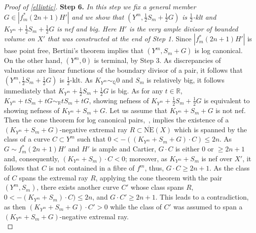 \documentclass{amsart}[12pt,a4paper]
\theoremstyle{definition}
\begin{document}
\begin{proof}[Proof of \ref{elliptic}]
{\bf Step 6.} {\it In this step we fix a general member $G \in |f_m^\ast(2n+1) H'|$ and we show that $(Y^m, \frac 1 2 S_m+\frac 1 2 G)$ is $\frac 1 2$-klt and $K_{Y^m}+\frac 1 2 S_m+\frac 1 2 G$ is nef and big.
Here $H'$ is the very ample divisor of bounded volume on $X'$ that was constructed at the end of Step 1.}
\newline
Since $|f_m^\ast (2n+1)H'|$ is base point free, Bertini's theorem implies that $(Y^m, S_m+G)$ is log canonical.
On the other hand, $(Y^m, 0)$ is terminal, by Step 3.
As discrepancies of valuations are linear functions of the boundary divisor of a pair, it follows that $(Y^m, \frac 1 2 S_m+\frac 1 2 G)$ is $\frac 1 2$-klt.
As $K_{Y^m} \sim_\mathbb{Q} 0$ and $S_m$ is relatively big, it follows immediately that $K_{Y^m}+\frac 1 2 S_m+\frac 1 2 G$ is big.
As for any $t \in \mathbb{R}$, $K_{Y^m}+t S_m+t G \sim_\mathbb{R} tS_m+tG$, showing nefness of $K_{Y^m}+\frac 1 2 S_m+\frac 1 2 G$ is equivalent to showing nefness of $K_{Y^m}+S_m+G$.
Let us assume that $K_{Y^m}+S_m+G$ is not nef.
Then the cone theorem for log canonical pairs,~\cite[Theorem 1.4]{MR2819675}, implies the existence of a $(K_{Y^m}+S_m+G)$-negative extremal ray $R \subset \overline{\mathrm{NE}}(X)$ which is spanned by the class of a curve $C \subset Y^m$ such that $0 <-((K_{Y^m}+S_m+G) \cdot C) \leq 2n$.
As $G \sim  f_m^\ast (2n+1) H'$ and $H'$ is ample and Cartier, $G \cdot C$ is either $0$ or $\geq 2n+1$ and, consequently, $(K_{Y^m} + S_m) \cdot C < 0$; moreover, as $K_{Y^m} + S_m$ is nef over $X'$, it follows that $C$ is not contained in a fibre of $f^m$, thus, $G \cdot C \geq 2n+1$.
As the class of $C$ spans the extremal ray $R$, applying the cone theorem with the pair $(Y^m, S_m)$, there exists another curve $C'$ whose class spans $R$, $0< -(K_{Y^m} + S_m) \cdot C)  \leq 2n$, and $G \cdot C' \geq 2n+1$.
This leads to a contradiction, as then $(K_{Y^m} + S_m+G) \cdot C'> 0$ while the class of $C'$ was assumed to span a $(K_{Y^m} + S_m+G)$-negative extremal ray.\\
 

\end{proof}
\end{document}
